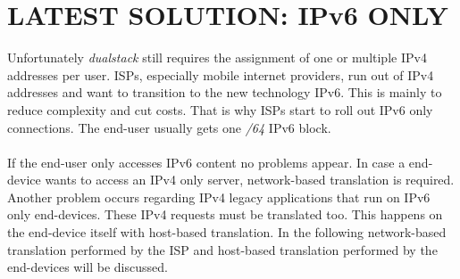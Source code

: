 \documentclass[format=sigconf, natbib=true, nonacm=true]{acmart}
\begin{document}
    \section{LATEST SOLUTION: IPv6 ONLY}
    Unfortunately \textit{dualstack} still requires the assignment of one or multiple IPv4 addresses per user. ISPs, especially mobile internet providers, run out of IPv4 addresses and want to transition to the new technology IPv6. This is mainly to reduce complexity and cut costs. That is why ISPs start to roll out IPv6 only connections. The end-user usually gets one \textit{/64} IPv6 block.\\\\If the end-user only accesses IPv6 content no problems appear. In case a end-device wants to access an IPv4 only server, network-based translation is required. Another problem occurs regarding IPv4 legacy applications that run on IPv6 only end-devices. These IPv4 requests must be translated too. This happens on the end-device itself with host-based translation. In the following network-based translation performed by the ISP and host-based translation performed by the end-devices will be discussed.
\end{document}
